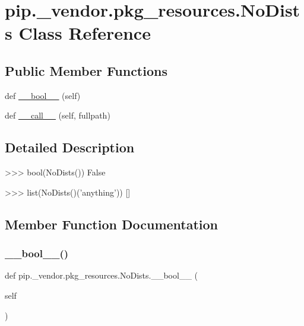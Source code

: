 \hypertarget{classpip_1_1__vendor_1_1pkg__resources_1_1NoDists}{}\section{pip.\+\_\+vendor.\+pkg\+\_\+resources.\+No\+Dists Class Reference}
\label{classpip_1_1__vendor_1_1pkg__resources_1_1NoDists}
\subsection*{Public Member Functions}
\begin{DoxyCompactItemize}
\item 
def \hyperlink{classpip_1_1__vendor_1_1pkg__resources_1_1NoDists_a8f56f2087b1d3a34e9f3a6c2ff0724b4}{\+\_\+\+\_\+bool\+\_\+\+\_\+} (self)
\item 
def \hyperlink{classpip_1_1__vendor_1_1pkg__resources_1_1NoDists_a185e353c7e4a7625ecbc268158a3c167}{\+\_\+\+\_\+call\+\_\+\+\_\+} (self, fullpath)
\end{DoxyCompactItemize}


\subsection{Detailed Description}
\begin{DoxyVerb}>>> bool(NoDists())
False

>>> list(NoDists()('anything'))
[]
\end{DoxyVerb}
 

\subsection{Member Function Documentation}
\mbox{\label{classpip_1_1__vendor_1_1pkg__resources_1_1NoDists_a8f56f2087b1d3a34e9f3a6c2ff0724b4}} 
\subsubsection{\texorpdfstring{\+\_\+\+\_\+bool\+\_\+\+\_\+()}{\_\_bool\_\_()}}
{\footnotesize\ttfamily def pip.\+\_\+vendor.\+pkg\+\_\+resources.\+No\+Dists.\+\_\+\+\_\+bool\+\_\+\+\_\+ (\begin{DoxyParamCaption}\item[{}]{self }\end{DoxyParamCaption})}

